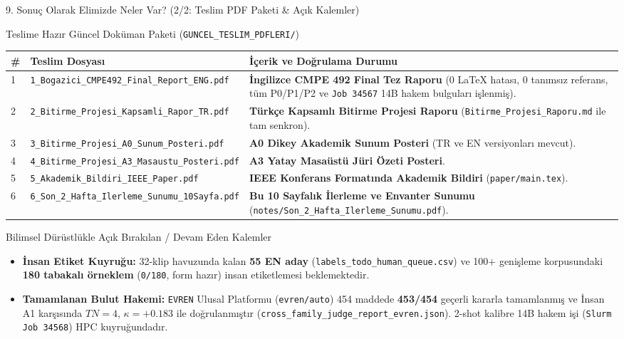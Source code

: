 \documentclass[aspectratio=169,10pt]{beamer}
\begin{document}
\begin{frame}{9. Sonuç Olarak Elimizde Neler Var? (2/2: Teslim PDF Paketi \& Açık Kalemler)}
\scriptsize
\begin{block}{Teslime Hazır Güncel Doküman Paketi (\texttt{GUNCEL\_TESLIM\_PDFLERI/})}
\begin{tabular}{llp{7.8cm}}
\toprule
\textbf{\#} & \textbf{Teslim Dosyası} & \textbf{İçerik ve Doğrulama Durumu} \\
\midrule
1 & \texttt{1\_Bogazici\_CMPE492\_Final\_Report\_ENG.pdf} & \textbf{İngilizce CMPE 492 Final Tez Raporu} (0 LaTeX hatası, 0 tanımsız referans, tüm P0/P1/P2 ve \texttt{Job 34567} 14B hakem bulguları işlenmiş). \\
2 & \texttt{2\_Bitirme\_Projesi\_Kapsamli\_Rapor\_TR.pdf} & \textbf{Türkçe Kapsamlı Bitirme Projesi Raporu} (\texttt{Bitirme\_Projesi\_Raporu.md} ile tam senkron). \\
3 & \texttt{3\_Bitirme\_Projesi\_A0\_Sunum\_Posteri.pdf} & \textbf{A0 Dikey Akademik Sunum Posteri} (TR ve EN versiyonları mevcut). \\
4 & \texttt{4\_Bitirme\_Projesi\_A3\_Masaustu\_Posteri.pdf} & \textbf{A3 Yatay Masaüstü Jüri Özeti Posteri}. \\
5 & \texttt{5\_Akademik\_Bildiri\_IEEE\_Paper.pdf} & \textbf{IEEE Konferans Formatında Akademik Bildiri} (\texttt{paper/main.tex}). \\
6 & \texttt{6\_Son\_2\_Hafta\_Ilerleme\_Sunumu\_10Sayfa.pdf} & \textbf{Bu 10 Sayfalık İlerleme ve Envanter Sunumu} (\texttt{notes/Son\_2\_Hafta\_Ilerleme\_Sunumu.pdf}). \\
\bottomrule
\end{tabular}
\end{block}

\begin{alertblock}{Bilimsel Dürüstlükle Açık Bırakılan / Devam Eden Kalemler}
\begin{itemize}
    \item \textbf{İnsan Etiket Kuyruğu:} 32-klip havuzunda kalan \textbf{55 EN aday} (\texttt{labels\_todo\_human\_queue.csv}) ve 100+ genişleme korpusundaki \textbf{180 tabakalı örneklem} (\texttt{0/180}, form hazır) insan etiketlemesi beklemektedir.
    \item \textbf{Tamamlanan Bulut Hakemi:} \texttt{EVREN} Ulusal Platformu (\texttt{evren/auto}) 454 maddede \textbf{453/454} geçerli kararla tamamlanmış ve İnsan A1 karşısında $TN=4$, $\kappa=+0.183$ ile doğrulanmıştır (\texttt{cross\_family\_judge\_report\_evren.json}). 2-shot kalibre 14B hakem işi (\texttt{Slurm Job 34568}) HPC kuyruğundadır.
\end{itemize}
\end{alertblock}
\end{frame}
\end{document}
